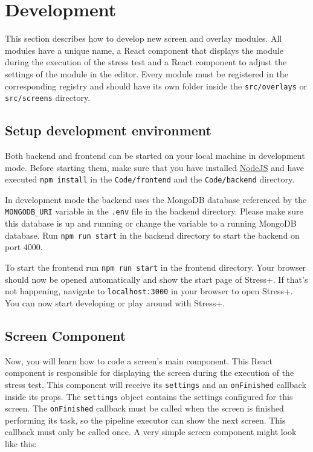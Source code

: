\section{Development}
\label{sec:development}

This section describes how to develop new screen and overlay modules.
All modules have a unique name, a React component that displays the module during the execution of the stress test and a React component to adjust the settings of the module in the editor. 
Every module must be registered in the corresponding registry and should have its own folder inside the \texttt{src/overlays} or \texttt{src/screens} directory.

\subsection{Setup development environment}
Both backend and frontend can be started on your local machine in development mode.
Before starting them, make sure that you have installed \href{https://nodejs.org}{NodeJS} and have executed \texttt{npm install} in the \texttt{Code/frontend} and the \texttt{Code/backend} directory.

In development mode the backend uses the MongoDB database referenced by the \texttt{MONGODB\_URI} variable in the \texttt{.env} file in the backend directory.
Please make sure this database is up and running or change the variable to a running MongoDB database.
Run \texttt{npm run start} in the backend directory to start the backend on port $4000$.

To start the frontend run \texttt{npm run start} in the frontend directory.
Your browser should now be opened automatically and show the start page of Stress+.
If that's not happening, navigate to \texttt{localhost:3000} in your browser to open Stress+.
You can now start developing or play around with Stress+.

\subsection{Screen Component}
\label{sec:development-screens}

Now, you will learn how to code a screen's main component. 
This React component is responsible for displaying the screen during the execution of the stress test.
This component will receive its \texttt{settings} and an \texttt{onFinished} callback inside its props. 
The \texttt{settings} object contains the settings configured for this screen. 
The \texttt{onFinished} callback must be called when the screen is finished performing its task, so the pipeline executor can show the next screen. 
This callback must only be called once. 
A very simple screen component might look like this:

